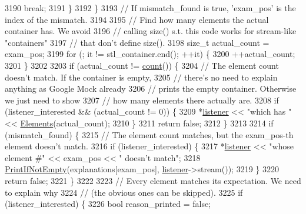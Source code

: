 \begin{DoxyCode}
3190         \textcolor{keywordflow}{break};
3191       \}
3192     \}
3193     \textcolor{comment}{// If mismatch\_found is true, 'exam\_pos' is the index of the mismatch.}
3194 
3195     \textcolor{comment}{// Find how many elements the actual container has.  We avoid}
3196     \textcolor{comment}{// calling size() s.t. this code works for stream-like "containers"}
3197     \textcolor{comment}{// that don't define size().}
3198     \textcolor{keywordtype}{size\_t} actual\_count = exam\_pos;
3199     \textcolor{keywordflow}{for} (; it != stl\_container.end(); ++it) \{
3200       ++actual\_count;
3201     \}
3202 
3203     \textcolor{keywordflow}{if} (actual\_count != \hyperlink{classtesting_1_1internal_1_1ElementsAreMatcherImpl_a8a8cf605a9fdc0eb8855fe9ce1aafb1e}{count}()) \{
3204       \textcolor{comment}{// The element count doesn't match.  If the container is empty,}
3205       \textcolor{comment}{// there's no need to explain anything as Google Mock already}
3206       \textcolor{comment}{// prints the empty container.  Otherwise we just need to show}
3207       \textcolor{comment}{// how many elements there actually are.}
3208       \textcolor{keywordflow}{if} (listener\_interested && (actual\_count != 0)) \{
3209         *\hyperlink{namespaceinteractive__marker_a0e579ab555212bb5e2c9f8a675b7618a}{listener} << \textcolor{stringliteral}{"which has "} << \hyperlink{classtesting_1_1internal_1_1ElementsAreMatcherImpl_a93f460d160390f2984c040e1869d3b0d}{Elements}(actual\_count);
3210       \}
3211       \textcolor{keywordflow}{return} \textcolor{keyword}{false};
3212     \}
3213 
3214     \textcolor{keywordflow}{if} (mismatch\_found) \{
3215       \textcolor{comment}{// The element count matches, but the exam\_pos-th element doesn't match.}
3216       \textcolor{keywordflow}{if} (listener\_interested) \{
3217         *\hyperlink{namespaceinteractive__marker_a0e579ab555212bb5e2c9f8a675b7618a}{listener} << \textcolor{stringliteral}{"whose element #"} << exam\_pos << \textcolor{stringliteral}{" doesn't match"};
3218         \hyperlink{namespacetesting_1_1internal_afa4cd5d7933878d6d820b32c87bb2767}{PrintIfNotEmpty}(explanations[exam\_pos], \hyperlink{namespaceinteractive__marker_a0e579ab555212bb5e2c9f8a675b7618a}{listener}->stream());
3219       \}
3220       \textcolor{keywordflow}{return} \textcolor{keyword}{false};
3221     \}
3222 
3223     \textcolor{comment}{// Every element matches its expectation.  We need to explain why}
3224     \textcolor{comment}{// (the obvious ones can be skipped).}
3225     \textcolor{keywordflow}{if} (listener\_interested) \{
3226       \textcolor{keywordtype}{bool} reason\_printed = \textcolor{keyword}{false};

\end{DoxyCode}
